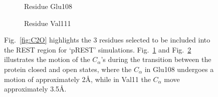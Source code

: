 \documentclass[T4paper.tex]{subfiles}
\begin{document}
\begin{figure}[!h]
\begin{subfigure}{.45\textwidth}
   \caption{Residue Glu108}
   \label{fig:Glu108-C2O}
\end{subfigure}\hfill
\begin{subfigure}{.45\textwidth}
   \centering
   \caption{Residue Val111}
   \label{fig:Val111-C2O}
\end{subfigure}\hfill
\caption{Fig.~\ref{fig:C2O} highlights the 3 residues selected to be included into the REST region for `pREST' simulations. Fig.~\ref{fig:Glu108-C2O} and Fig.~\ref{fig:Val111-C2O} illustrates the motion of the $C_{\alpha}$'s during the transition between the protein closed and open states, where the $C_{\alpha}$ in Glu108 undergoes a motion of approximately 2\AA, while in Val11 the $C_{\alpha}$ move approximately 3.5\AA.}
\label{fig:pRESTresidues}
\end{figure}
\end{document}
